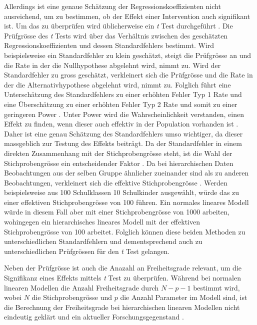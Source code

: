 \documentclass[12pt]{article}\usepackage[]{graphicx}\usepackage[]{color}
\begin{document}
Allerdings ist eine genaue Schätzung der Regressionskoeffizienten nicht ausreichend, um zu bestimmen, ob der Effekt einer Intervention auch signifikant ist. Um das zu überprüfen wird üblicherweise ein \textit{t} Test durchgeführt \citep{SnijdersTomA.B2012Ma:a}. Die Prüfgrösse des \textit{t} Tests wird über das Verhältnis zwischen des geschätzten Regressionskoeffizienten und dessen Standardfehlers bestimmt. Wird beispielsweise ein Standardfehler zu klein geschätzt, steigt die Prüfgrösse an und die Rate in der die Nullhypothese abgelehnt wird, nimmt zu. Wird der Standardfehler zu gross geschätzt, verkleinert sich die Prüfgrösse und die Rate in der die Alternativhypothese abgelehnt wird, nimmt zu. Folglich führt eine Unterschätzung des Standardfehlers zu einer erhöhten Fehler Typ 1 Rate und eine Überschätzung zu einer erhöhten Fehler Typ 2 Rate und somit zu einer geringeren Power \citep{SnijdersTomA.B2012Ma:a}. Unter Power wird die Wahrscheinlichkeit verstanden, einen Effekt zu finden, wenn dieser auch effektiv in der Population vorhanden ist \citep{scherbaumferreter2009powersample}. Daher ist eine genau Schätzung des Standardfehlers umso wichtiger, da dieser massgeblich zur Testung des Effekts beiträgt. Da der Standardfehler in einem direkten Zusammenhang mit der Stichprobengrösse steht, ist die Wahl der Stichprobengrösse ein entscheidender Faktor \citep{mcneish2014analyzing, SnijdersTomA.B2012Ma:a}. Da bei hierarchischen Daten Beobachtungen aus der selben Gruppe ähnlicher zueinander sind als zu anderen Beobachtungen, verkleinert sich die effektive Stichprobengrösse \citep{raudenbush2002hierarchical}. Werden beispielsweise aus 100 Schulklassen 10 Schulkinder ausgewählt, würde das zu einer effektiven Stichprobengrösse von 100 führen. Ein normales lineares Modell würde in diesem Fall aber mit einer Stichprobengrösse von 1000 arbeiten, wohingegen ein hierarchisches lineares Modell mit der effektiven Stichprobengrösse von 100 arbeitet. Folglich können diese beiden Methoden zu unterschiedlichen Standardfehlern und dementsprechend auch zu unterschiedlichen Prüfgrössen für den \textit{t} Test gelangen. 

Neben der Prüfgrösse ist auch die Anazahl an Freiheitsgrade relevant, um die Signifikanz eines Effekts mittels \textit{t} Test zu überprüfen. Während bei normalen linearen Modellen die Anzahl Freiheitsgrade durch $N - p - 1$ bestimmt wird, wobei $N$ die Stichprobengrösse und $p$ die Anzahl Parameter im Modell sind, ist die Berechnung der Freiheitsgrade bei hierarchischen linearen Modellen nicht eindeutig geklärt und ein aktueller Forschungsgegenstand \citep{mcneish2014analyzing,raudenbush2002hierarchical,SnijdersTomA.B2012Ma:a}.
\end{document}
